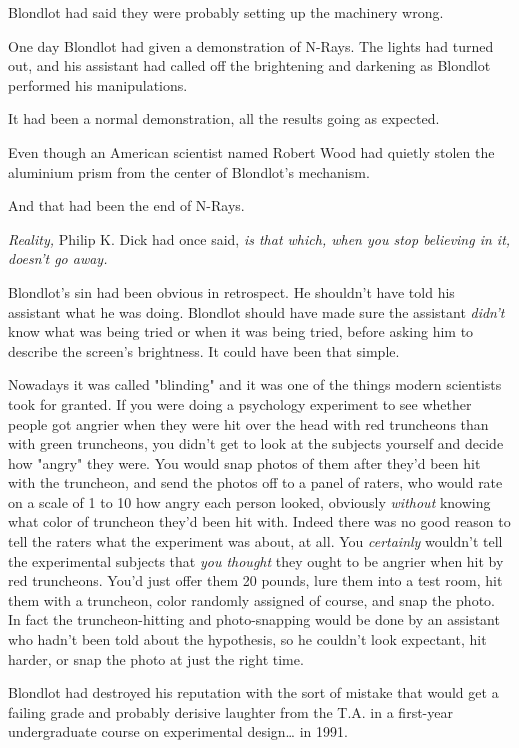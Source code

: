 Blondlot had said they were probably setting up the machinery wrong.

One day Blondlot had given a demonstration of N-Rays. The lights had turned
out, and his assistant had called off the brightening and darkening as Blondlot
performed his manipulations.

It had been a normal demonstration, all the results going as expected.

Even though an American scientist named Robert Wood had quietly stolen the
aluminium prism from the center of Blondlot's mechanism.

And that had been the end of N-Rays.

\emph{Reality,} Philip K. Dick had once said, \emph{is that which, when you
stop believing in it, doesn't go away.}

Blondlot's sin had been obvious in retrospect. He shouldn't have told his
assistant what he was doing. Blondlot should have made sure the assistant
\emph{didn't} know what was being tried or when it was being tried, before
asking him to describe the screen's brightness. It could have been that simple.

Nowadays it was called "blinding" and it was one of the things modern
scientists took for granted. If you were doing a psychology experiment to see
whether people got angrier when they were hit over the head with red truncheons
than with green truncheons, you didn't get to look at the subjects yourself and
decide how "angry" they were. You would snap photos of them after they'd been
hit with the truncheon, and send the photos off to a panel of raters, who would
rate on a scale of 1 to 10 how angry each person looked, obviously
\emph{without} knowing what color of truncheon they'd been hit with. Indeed
there was no good reason to tell the raters what the experiment was about, at
all. You \emph{certainly} wouldn't tell the experimental subjects that
\emph{you thought} they ought to be angrier when hit by red truncheons. You'd
just offer them 20 pounds, lure them into a test room, hit them with a
truncheon, color randomly assigned of course, and snap the photo. In fact the
truncheon-hitting and photo-snapping would be done by an assistant who hadn't
been told about the hypothesis, so he couldn't look expectant, hit harder, or
snap the photo at just the right time.

Blondlot had destroyed his reputation with the sort of mistake that would get a
failing grade and probably derisive laughter from the T.A. in a first-year
undergraduate course on experimental design{\ldots} in 1991.

